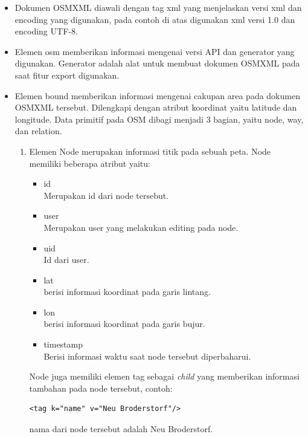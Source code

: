 \begin{itemize}
\item Dokumen OSMXML diawali dengan tag xml yang menjelaskan versi xml dan
encoding yang digunakan, pada contoh di atas digunakan xml versi 1.0 dan
encoding UTF-8.

\item Elemen osm memberikan informasi mengenai versi API dan generator yang
digunakan. Generator adalah alat untuk membuat dokumen OSMXML pada saat fitur
export digunakan. 

\item Elemen bound memberikan informasi mengenai cakupan area pada dokumen
OSMXML tersebut. Dilengkapi dengan atribut koordinat yaitu latitude dan longitude.
Data primitif pada OSM dibagi menjadi 3 bagian, yaitu node, way, dan relation.
\begin{enumerate}
\item Elemen Node merupakan informasi titik pada sebuah peta. Node memiliki
beberapa atribut yaitu:
\begin{itemize}
\item id \\
Merupakan id dari node tersebut.

\item user \\ 
Merupakan user yang melakukan editing pada node.

\item uid \\
Id dari user.

\item lat \\
berisi informasi koordinat pada garis lintang.

\item lon \\
berisi informasi koordinat pada garis bujur.

\item timestamp \\
Berisi informasi waktu saat node tersebut diperbaharui.
\end{itemize}
Node juga memiliki elemen tag sebagai \textit{child} yang memberikan informasi
tambahan pada node tersebut, contoh:
\begin{verbatim}
<tag k="name" v="Neu Broderstorf"/>
\end{verbatim}
nama dari node tersebut adalah Neu Broderstorf.


\end{enumerate}
\end{itemize}
